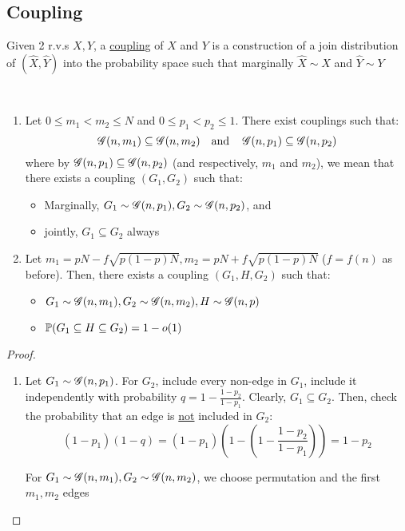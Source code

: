 \subsection{Coupling}
\begin{definition}
    Given 2 r.v.s $X, Y$, a \ul{coupling} of $X$ and $Y$ is a construction of a join distribution of $(\hat{X}, \hat{Y})$ into the probability space such that marginally $\hat{X} \sim X$ and $\hat{Y} \sim Y$
\end{definition}

\begin{lemma}
    ~
    \begin{enumerate}[label = (\alph*)]
        \item Let $0 \leq m_1 < m_2 \leq N$ and $0 \leq p_1 < p_2 \leq 1$.
        There exist couplings such that:
        \begin{equation*}
            \operatorname{\mathscr{G}}(n, m_1) \subseteq \operatorname{\mathscr{G}}(n, m_2) \quad \text{and} \quad \operatorname{\mathscr{G}}(n, p_1) \subseteq \operatorname{\mathscr{G}}(n, p_2) 
        \end{equation*}
        where by $\operatorname{\mathscr{G}}(n, p_1) \subseteq \operatorname{\mathscr{G}}(n, p_2)$ (and respectively, $m_1$ and $m_2$), we mean that there exists a coupling $(G_1, G_2)$ such that:
        \begin{itemize}
            \item Marginally, $G_1 \sim \operatorname{\mathscr{G}}(n, p_1), G_2 \sim \operatorname{\mathscr{G}}(n, p_2)$, and
            \item jointly, $G_1 \subseteq G_2$ always
        \end{itemize}


        \item Let $m_1 = pN - f\sqrt{p(1-p)N}, m_2 = pN + f\sqrt{p(1-p)N}$ ($f = f(n)$ as before).
        Then, there exists a coupling $(G_1, H, G_2)$ such that:
        \begin{itemize}
            \item $G_1 \sim \operatorname{\mathscr{G}}(n, m_1), G_2 \sim \operatorname{\mathscr{G}}(n, m_2), H \sim \operatorname{\mathscr{G}}(n, p)$
            \item $\operatorname{\mathbb{P}}(G_1 \subseteq H \subseteq G_2) = 1 - o(1)$
        \end{itemize}
    \end{enumerate}
\end{lemma}
\begin{proof}
    ~
    \begin{enumerate}[label = (\alph*)]
        \item Let $G_1 \sim \operatorname{\mathscr{G}}(n, p_1)$.
        For $G_2$, include every non-edge in $G_1$, include it independently with probability $q = 1 - \frac{1 - p_2}{1 - p_1}$.
        Clearly, $G_1 \subseteq G_2$.
        Then, check the probability that an edge is \ul{not} included in $G_2$:
        \begin{equation*}
            (1 - p_1)(1 - q) = (1 - p_1)\left(1 - \left(1 - \frac{1 - p_2}{1 - p_1}\right)\right) = 1 - p_2
        \end{equation*}

        For $G_1 \sim \operatorname{\mathscr{G}}(n, m_1), G_2 \sim \operatorname{\mathscr{G}}(n, m_2)$, we choose permutation and the first $m_1, m_2$ edges
    \end{enumerate}
\end{proof}

